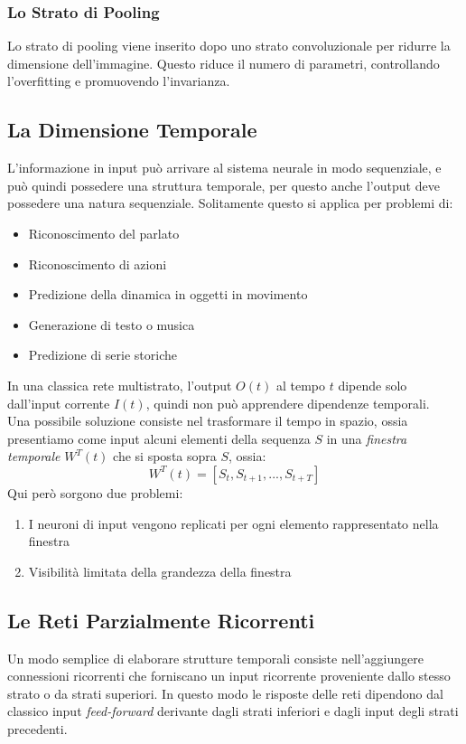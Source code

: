 \documentclass[12pt, a4paper]{article}
\begin{document}
\subsubsection{Lo Strato di Pooling}
Lo strato di pooling viene inserito dopo uno strato convoluzionale per ridurre la dimensione dell'immagine. Questo riduce il numero di parametri, controllando l'overfitting e promuovendo l'invarianza.

\subsection{La Dimensione Temporale}
L'informazione in input può arrivare al sistema neurale in modo sequenziale, e può quindi possedere una struttura temporale, per questo anche l'output deve possedere una natura sequenziale.
Solitamente questo si applica per problemi di:
\begin{itemize}
    \item Riconoscimento del parlato
    \item Riconoscimento di azioni
    \item Predizione della dinamica in oggetti in movimento
    \item Generazione di testo o musica
    \item Predizione di serie storiche
\end{itemize}

In una classica rete multistrato, l'output \(O(t)\) al tempo \(t\) dipende solo dall'input corrente \(I(t)\), quindi non può apprendere dipendenze temporali.\\
Una possibile soluzione consiste nel trasformare il tempo in spazio, ossia presentiamo come input alcuni elementi della sequenza \(S\) in una \textit{finestra temporale} \(W^T(t)\) che si sposta sopra \(S\), ossia:
\[W^T(t)=[S_t, S_{t+1}, ... , S_{t+T}]\]
Qui però sorgono due problemi:
\begin{enumerate}
    \item I neuroni di input vengono replicati per ogni elemento rappresentato nella finestra
    \item Visibilità limitata della grandezza della finestra
\end{enumerate}
\subsection{Le Reti Parzialmente Ricorrenti}
Un modo semplice di elaborare strutture temporali consiste nell'aggiungere connessioni ricorrenti che forniscano un input ricorrente proveniente dallo stesso strato o da strati superiori. In questo modo le risposte delle reti dipendono dal classico input \textit{feed-forward} derivante dagli strati inferiori e dagli input degli strati precedenti.\\
\end{document}
